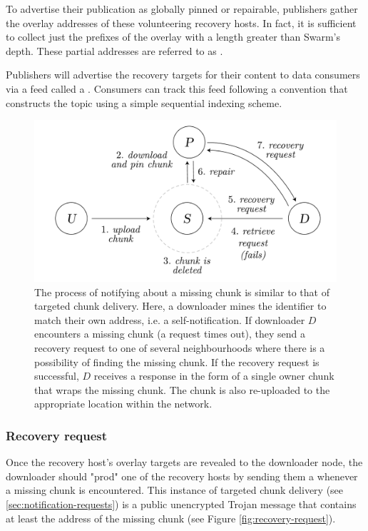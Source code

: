 To advertise their publication as globally pinned or repairable, publishers gather the overlay addresses of these volunteering recovery hosts. In fact, it is sufficient to collect just the prefixes of the overlay with a length greater than Swarm's depth. These partial addresses are referred to as .

Publishers will advertise the recovery targets for their content to data consumers via a feed called a . Consumers can track this feed following a convention that constructs the topic using a simple sequential indexing scheme. 

\begin{figure}[htbp]
\centering
\includegraphics[width=.8\textwidth]{fig/missing-chunk-notification.pdf} \caption[Missing chunk notification process \statusgreen]{The process of notifying about a missing chunk is similar to that of targeted chunk delivery. Here, a downloader mines the identifier to match their own address, i.e. a self-notification. If downloader $D$ encounters a missing chunk (a request times out), they send a recovery request to one of several neighbourhoods where there is a possibility of finding the missing chunk. If the recovery request is successful, $D$ receives a response in the form of a single owner chunk that wraps the missing chunk. The chunk is also re-uploaded to the appropriate location within the network.}
\label{fig:missing-chunk-notification}
\end{figure}

\subsubsection{Recovery request}

Once the recovery host's overlay targets are revealed to the downloader node, the downloader should "prod" one of the recovery hosts by sending them a  whenever a missing chunk is encountered. This instance of targeted chunk delivery (see \ref{sec:notification-requests}) is a public unencrypted Trojan message that contains at least the address of the missing chunk (see Figure \ref{fig:recovery-request}).

